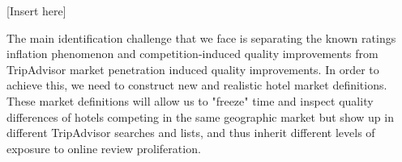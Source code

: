 \documentclass[mksc,blindrev]{informs3} %
\begin{document}
[Insert  here]


The main identification challenge that we face is separating the known ratings inflation phenomenon and competition-induced quality improvements from TripAdvisor market penetration induced quality improvements. In order to achieve this, we need to construct new and realistic hotel market definitions. These market definitions will allow us to "freeze" time and inspect quality differences of hotels competing in the same geographic market but show up in different TripAdvisor searches and lists, and thus inherit different levels of exposure to online review proliferation.



\end{document}
